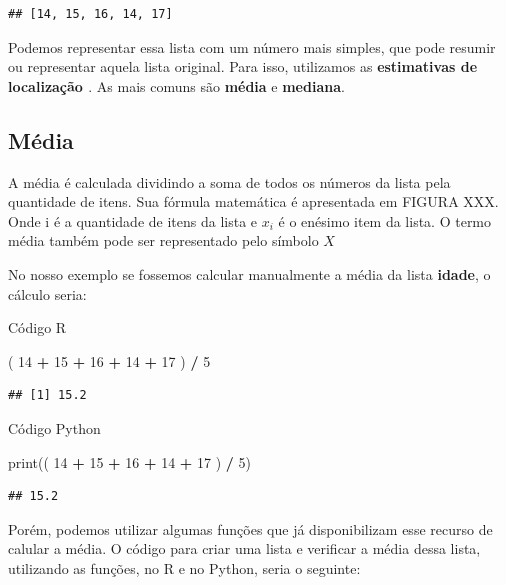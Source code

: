 \documentclass[
]{book}
\newenvironment{Shaded}{\begin{snugshade}}{\end{snugshade}}
\newcommand{\BuiltInTok}[1]{#1}
\newcommand{\DecValTok}[1]{\textcolor[rgb]{0.00,0.00,0.81}{#1}}
\newcommand{\NormalTok}[1]{#1}
\newcommand{\OperatorTok}[1]{\textcolor[rgb]{0.81,0.36,0.00}{\textbf{#1}}}
\newcommand{\SpecialCharTok}[1]{\textcolor[rgb]{0.81,0.36,0.00}{\textbf{#1}}}
\begin{document}
\begin{verbatim}
## [14, 15, 16, 14, 17]
\end{verbatim}

Podemos representar essa lista com um número mais simples, que pode resumir ou representar aquela lista original. Para isso, utilizamos as \textbf{estimativas de localização \citep{bruce2020practical}}. As mais comuns são \textbf{média} e \textbf{mediana}.

\subsection{Média}\label{muxe9dia}

A média é calculada dividindo a soma de todos os números da lista pela quantidade de itens. Sua fórmula matemática é apresentada em FIGURA XXX. Onde i é a quantidade de itens da lista e \(x_i\) é o enésimo item da lista. O termo média também pode ser representado pelo símbolo \(X\)

No nosso exemplo se fossemos calcular manualmente a média da lista \textbf{idade}, o cálculo seria:

Código R

\begin{Shaded}
\begin{Highlighting}[]
\NormalTok{( }\DecValTok{14} \SpecialCharTok{+} \DecValTok{15} \SpecialCharTok{+} \DecValTok{16} \SpecialCharTok{+} \DecValTok{14} \SpecialCharTok{+} \DecValTok{17}\NormalTok{ ) }\SpecialCharTok{/} \DecValTok{5}
\end{Highlighting}
\end{Shaded}

\begin{verbatim}
## [1] 15.2
\end{verbatim}

Código Python

\begin{Shaded}
\begin{Highlighting}[]
\BuiltInTok{print}\NormalTok{(( }\DecValTok{14} \OperatorTok{+} \DecValTok{15} \OperatorTok{+} \DecValTok{16} \OperatorTok{+} \DecValTok{14} \OperatorTok{+} \DecValTok{17}\NormalTok{ ) }\OperatorTok{/} \DecValTok{5}\NormalTok{)}
\end{Highlighting}
\end{Shaded}

\begin{verbatim}
## 15.2
\end{verbatim}

Porém, podemos utilizar algumas funções que já disponibilizam esse recurso de calular a média. O código para criar uma lista e verificar a média dessa lista, utilizando as funções, no R e no Python, seria o seguinte:
\end{document}
